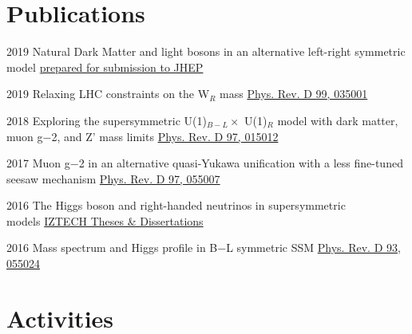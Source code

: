 \documentclass[]{friggeri-cv}
\begin{document}
\section{Publications}

\begin{entrylist}
	
	\entry
	{2019}
	{Natural Dark Matter and light bosons in an alternative left-right symmetric model}
	{\href{https://arxiv.org/pdf/1911.12883.pdf}{prepared for submission to JHEP}} 
	
	
	\entry
	{2019}
	{Relaxing LHC constraints on the W$_R$ mass}
	{\href{https://journals.aps.org/prd/abstract/10.1103/PhysRevD.99.035001}{Phys. Rev. D 99, 035001}} 
	
	
	\entry
	{2018}
	{Exploring the supersymmetric U(1)$_{B-L} \times$ U(1)$_R$ model with dark matter, muon g−2, and Z' mass limits}
	{\href{https://journals.aps.org/prd/abstract/10.1103/PhysRevD.97.015012}{Phys. Rev. D 97, 015012}} 
	
	\entry
	{2017}
	{Muon g−2 in an alternative quasi-Yukawa unification with a less fine-tuned seesaw mechanism}
	{\href{http://journals.aps.org/prd/abstract/10.1103/PhysRevD.97.055007}{Phys. Rev. D 97, 055007}} 
	
	\entry
	{2016}
	{The Higgs boson and right-handed neutrinos in supersymmetric \\ models}
	{\href{http://openaccess.iyte.edu.tr/xmlui/handle/11147/2842}{IZTECH Theses \& Dissertations}} 
	
	\entry
	{2016}
	{Mass spectrum and Higgs profile in B−L symmetric SSM}
	{\href{http://journals.aps.org/prd/abstract/10.1103/PhysRevD.93.055024}{Phys. Rev. D 93, 055024}} 
	
\end{entrylist}

\section{Activities}
\end{document}
